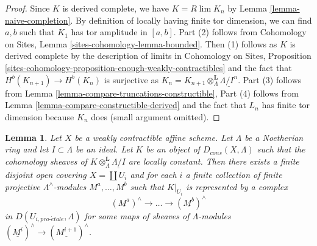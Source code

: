 \documentclass{stacks-project}
\theoremstyle{plain}
\newtheorem{lemma}[subsection]{Lemma}
\theoremstyle{definition}
\theoremstyle{remark}
\numberwithin{equation}{subsection}
\def\lim{\mathop{\mathrm{lim}}\nolimits}
\def\proetale{{pro\text{-}\acute{e}tale}}
\begin{document}
\begin{proof}
Since $K$ is derived complete, we have $K = R\lim K_n$ by
Lemma \ref{lemma-naive-completion}.
By definition of locally having finite tor dimension, we can find
$a, b$ such that $K_1$ has tor amplitude in $[a, b]$.
Part (2) follows from 
Cohomology on Sites, Lemma \ref{sites-cohomology-lemma-bounded}.
Then (1) follows as $K$ is derived complete by the description
of limits in
Cohomology on Sites, Proposition
\ref{sites-cohomology-proposition-enough-weakly-contractibles}
and the fact that $H^b(K_{n + 1}) \to H^b(K_n)$ is surjective
as $K_n = K_{n + 1} \otimes^\mathbf{L}_\Lambda \underline{\Lambda/I^n}$.
Part (3) follows from
Lemma \ref{lemma-compare-truncations-constructible},
Part (4) follows from
Lemma \ref{lemma-compare-constructible-derived}
and the fact that $L_n$ has finite tor dimension because $K_n$ does
(small argument omitted).
\end{proof}

\begin{lemma}
\label{lemma-local-structure-constructible-complex}
Let $X$ be a weakly contractible affine scheme. Let $\Lambda$ be a Noetherian
ring and let $I \subset \Lambda$ be an ideal. Let $K$ be an object of
$D_{cons}(X, \Lambda)$ such that the cohomology sheaves of
$K \otimes_\Lambda^\mathbf{L} \underline{\Lambda/I}$ are locally
constant. Then there exists a finite disjoint open covering
$X = \coprod U_i$ and for each $i$ a finite collection of
finite projective $\Lambda^\wedge$-modules $M^a, \ldots, M^b$
such that $K|_{U_i}$ is represented by a complex
$$
(\underline{M^a})^\wedge \to \ldots \to (\underline{M^b})^\wedge
$$
in $D(U_{i, \proetale}, \Lambda)$ for some maps of sheaves of
$\Lambda$-modules $(\underline{M^i})^\wedge \to (\underline{M^{i + 1}})^\wedge$.
\end{lemma}
\end{document}
